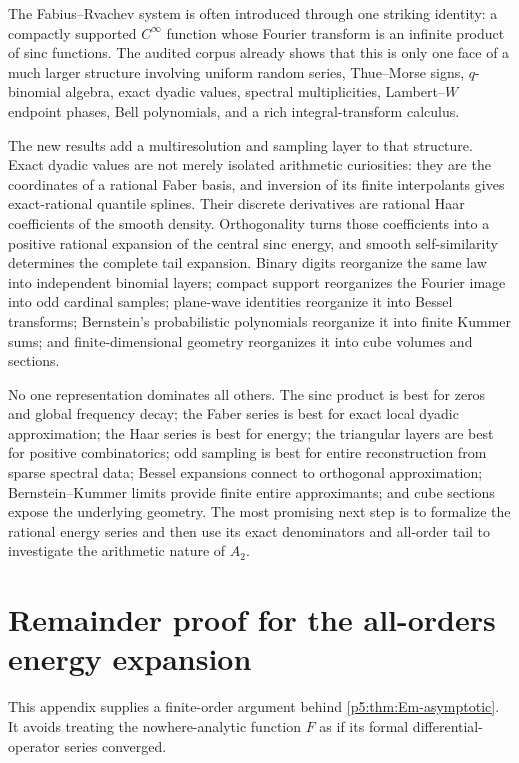 \documentclass[11pt,oneside]{article}
\theoremstyle{definition}
\begin{document}
The Fabius--Rvachev system is often introduced through one striking identity:
a compactly supported $C^\infty$ function whose Fourier transform is an
infinite product of sinc functions.  The audited corpus already shows that
this is only one face of a much larger structure involving uniform random
series, Thue--Morse signs, $q$-binomial algebra, exact dyadic values, spectral
multiplicities, Lambert--$W$ endpoint phases, Bell polynomials, and a rich
integral-transform calculus.

The new results add a multiresolution and sampling layer to that structure.
Exact dyadic values are not merely isolated arithmetic curiosities: they are
the coordinates of a rational Faber basis, and inversion of its finite
interpolants gives exact-rational quantile splines.  Their discrete derivatives are
rational Haar coefficients of the smooth density.  Orthogonality turns those
coefficients into a positive rational expansion of the central sinc energy,
and smooth self-similarity determines the complete tail expansion.  Binary
digits reorganize the same law into independent binomial layers; compact
support reorganizes the Fourier image into odd cardinal samples; plane-wave
identities reorganize it into Bessel transforms; Bernstein's probabilistic
polynomials reorganize it into finite Kummer sums; and finite-dimensional
geometry reorganizes it into cube volumes and sections.

No one representation dominates all others.  The sinc product is best for
zeros and global frequency decay; the Faber series is best for exact local
dyadic approximation; the Haar series is best for energy; the triangular
layers are best for positive combinatorics; odd sampling is best for entire
reconstruction from sparse spectral data; Bessel expansions connect to
orthogonal approximation; Bernstein--Kummer limits provide finite entire
approximants; and cube sections expose the underlying geometry.  The most
promising next step is to formalize the rational energy series and then use
its exact denominators and all-order tail to investigate the arithmetic nature
of $A_2$.

\appendix

\section{Remainder proof for the all-orders energy expansion}
\label{p5:app:energy-proof}

This appendix supplies a finite-order argument behind
\cref{p5:thm:Em-asymptotic}.  It avoids treating the nowhere-analytic function
$F$ as if its formal differential-operator series converged.
\end{document}
